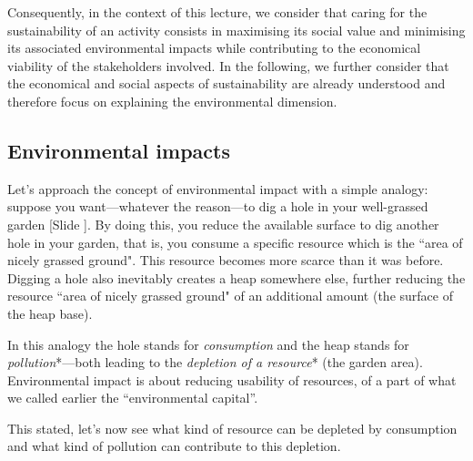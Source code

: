 \documentclass{article}
\newcounter{slide}
\begin{document}
Consequently, in the context of this lecture, we consider that caring for the sustainability of an activity consists in maximising its social value and minimising its associated environmental impacts while contributing to the economical viability of the stakeholders involved. {\color{red}In the following, we further consider that the economical and social aspects of sustainability are already understood and therefore focus on explaining the environmental dimension.}

\subsection{Environmental impacts}
\label{sec:EnvironmentalImpacts}

Let's approach the concept of environmental impact with a simple analogy: suppose you want---whatever the reason---to dig a hole in your well-grassed garden {\color{blue}[Slide ]}. By doing this, you reduce the available surface to dig another hole in your garden, that is, you consume a specific resource which is the ``area of nicely grassed ground". This resource becomes more scarce than it was before. Digging a hole also inevitably creates a heap somewhere else, further reducing the resource ``area of nicely grassed ground" of an additional amount (the surface of the heap base). 

In this analogy the hole stands for \emph{consumption} and the heap stands for \emph{pollution}*---both leading to the \emph{depletion of a resource}* (the garden area). Environmental impact is about reducing usability of resources, of a part of what we called earlier the ``environmental capital''. 

This stated, let's now see what kind of resource can be depleted by consumption and what kind of pollution can contribute to this depletion.
\end{document}
